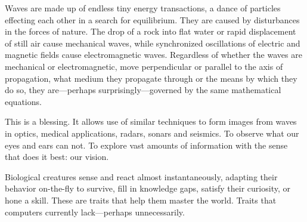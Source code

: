 {Waves are made up of endless tiny energy transactions, a dance of particles effecting each other in a search for equilibrium. They are caused by disturbances in the forces of nature. The drop of a rock into flat water or rapid displacement of still air cause mechanical waves, while synchronized oscillations of electric and magnetic fields cause electromagnetic waves. Regardless of whether the waves are mechanical or electromagnetic, move perpendicular or parallel to the axis of propagation, what medium they propagate through or the means by which they do so, they are---perhaps surprisingly---governed by the same mathematical equations.

This is a blessing. It allows use of similar techniques to form images from waves in optics, medical applications, radars, sonars and seismics. To observe what our eyes and ears can not. To explore vast amounts of information with the sense that does it best: our vision.

Biological creatures sense and react almost instantaneously, adapting their behavior on-the-fly to survive, fill in knowledge gaps, satisfy their curiosity, or hone a skill. These are traits that help them master the world. Traits that computers currently lack---perhaps unnecessarily.


%          


\IncludeWritingTipstrue
\newcommand\tip[1]{\ifIncludeWritingTips{}#1\fi}




}
